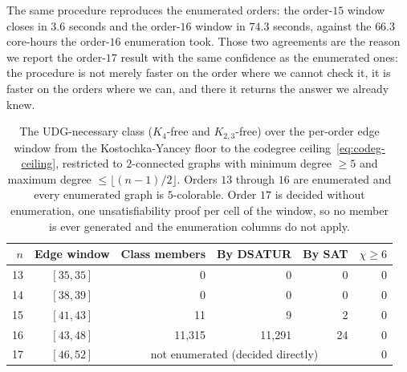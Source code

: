 \documentclass[11pt]{article}
\theoremstyle{definition}
\newcommand{\chrom}{\chi}
\begin{document}
The same procedure reproduces the enumerated orders: the order-$15$ window closes
in $3.6$ seconds and the order-$16$ window in $74.3$ seconds, against the $66.3$
core-hours the order-$16$ enumeration took. Those two agreements are the reason we
report the order-$17$ result with the same confidence as the enumerated ones: the
procedure is not merely faster on the order where we cannot check it, it is faster
on the orders where we can, and there it returns the answer we already knew.

\begin{table}[ht]
\centering
\caption{The UDG-necessary class ($K_4$-free and $K_{2,3}$-free) over the
per-order edge window from the Kostochka-Yancey floor to the codegree
ceiling~\eqref{eq:codeg-ceiling}, restricted to $2$-connected graphs with minimum
degree $\ge 5$ and maximum degree $\le \lfloor (n-1)/2 \rfloor$. Orders $13$
through $16$ are enumerated and every enumerated graph is $5$-colorable. Order
$17$ is decided without enumeration, one unsatisfiability proof per cell of the
window, so no member is ever generated and the enumeration columns do not apply.}
\label{tab:e17}
\begin{tabular}{r c r r r r}
\toprule
$n$ & Edge window & Class members & By DSATUR & By SAT & $\chrom \ge 6$ \\
\midrule
13 & $[35, 35]$ & 0 & 0 & 0 & 0 \\
14 & $[38, 39]$ & 0 & 0 & 0 & 0 \\
15 & $[41, 43]$ & 11 & 9 & 2 & 0 \\
16 & $[43, 48]$ & 11{,}315 & 11{,}291 & 24 & 0 \\
17 & $[46, 52]$ & \multicolumn{3}{c}{not enumerated (decided directly)} & 0 \\
\bottomrule
\end{tabular}
\end{table}
\end{document}
